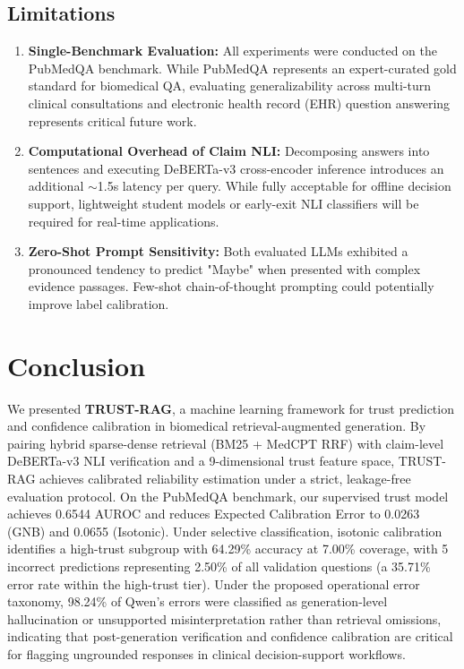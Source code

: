 \documentclass[journal,10pt]{IEEEtran}
\begin{document}
\subsection{Limitations}
\begin{enumerate}
    \item \textbf{Single-Benchmark Evaluation:} All experiments were conducted on the PubMedQA benchmark. While PubMedQA represents an expert-curated gold standard for biomedical QA, evaluating generalizability across multi-turn clinical consultations and electronic health record (EHR) question answering represents critical future work.
    \item \textbf{Computational Overhead of Claim NLI:} Decomposing answers into sentences and executing DeBERTa-v3 cross-encoder inference introduces an additional $\sim$1.5s latency per query. While fully acceptable for offline decision support, lightweight student models or early-exit NLI classifiers will be required for real-time applications.
    \item \textbf{Zero-Shot Prompt Sensitivity:} Both evaluated LLMs exhibited a pronounced tendency to predict "Maybe" when presented with complex evidence passages. Few-shot chain-of-thought prompting could potentially improve label calibration.
\end{enumerate}

\section{Conclusion}
We presented \textbf{TRUST-RAG}, a machine learning framework for trust prediction and confidence calibration in biomedical retrieval-augmented generation. By pairing hybrid sparse-dense retrieval (BM25 + MedCPT RRF) with claim-level DeBERTa-v3 NLI verification and a 9-dimensional trust feature space, TRUST-RAG achieves calibrated reliability estimation under a strict, leakage-free evaluation protocol. On the PubMedQA benchmark, our supervised trust model achieves 0.6544 AUROC and reduces Expected Calibration Error to 0.0263 (GNB) and 0.0655 (Isotonic). Under selective classification, isotonic calibration identifies a high-trust subgroup with 64.29\% accuracy at 7.00\% coverage, with 5 incorrect predictions representing 2.50\% of all validation questions (a 35.71\% error rate within the high-trust tier). Under the proposed operational error taxonomy, 98.24\% of Qwen's errors were classified as generation-level hallucination or unsupported misinterpretation rather than retrieval omissions, indicating that post-generation verification and confidence calibration are critical for flagging ungrounded responses in clinical decision-support workflows.
\end{document}
